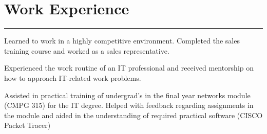 \documentclass[]{neilfoxcroft-resume}
\begin{document}
\begin{minipage}[t]{0.66\textwidth}
\section{Work Experience} 
\noindent\rule{12.5cm}{0.4pt}
 
\noindent
\hspace{5em}%
\begin{minipage}{0.85\textwidth\vspace{2pt}}
Learned to work in a highly competitive environment. Completed the sales training course and worked as a sales representative.
\end{minipage}
 
\noindent
\hspace{5em}%
\begin{minipage}{0.85\textwidth\vspace{2pt}}
Experienced the work routine of an IT professional and received mentorship on how to approach IT-related work problems.
\end{minipage}
 
\noindent
\hspace{5em}%
\begin{minipage}{0.85\textwidth\vspace{2pt}}
Assisted in practical training of undergrad's in the final year networks module (CMPG 315) for the IT degree. Helped with feedback regarding assignments in the module and aided in the understanding of required practical software (CISCO Packet Tracer)
\end{minipage}

\end{minipage}
\end{document}
